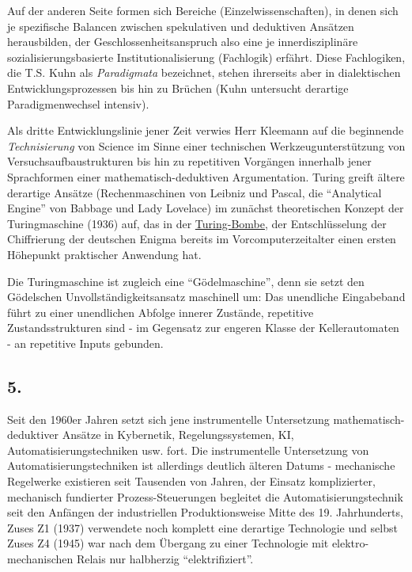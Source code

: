 \documentclass[11pt,a4paper]{article}
\begin{document}
Auf der anderen Seite formen sich Bereiche (Einzelwissenschaften), in
denen sich je spezifische Balancen zwischen spekulativen und deduktiven
Ansätzen herausbilden, der Geschlossenheitsanspruch also eine je
innerdisziplinäre sozialisierungsbasierte Institutionalisierung
(Fachlogik) erfährt. Diese Fachlogiken, die T.S. Kuhn als
\emph{Paradigmata} bezeichnet, stehen ihrerseits aber in dialektischen
Entwicklungsprozessen bis hin zu Brüchen (Kuhn untersucht derartige
Paradigmenwechsel intensiv).

Als dritte Entwicklungslinie jener Zeit verwies Herr Kleemann auf die
beginnende \emph{Technisierung} von Science im Sinne einer technischen
Werkzeugunterstützung von Versuchsaufbaustrukturen bis hin zu
repetitiven Vorgängen innerhalb jener Sprachformen einer
mathematisch-deduktiven Argumentation. Turing greift ältere derartige
Ansätze (Rechenmaschinen von Leibniz und Pascal, die ``Analytical
Engine'' von Babbage und Lady Lovelace) im zunächst theoretischen
Konzept der Turingmaschine (1936) auf, das in der
\href{https://de.wikipedia.org/wiki/Turing-Bombe}{Turing-Bombe}, der
Entschlüsselung der Chiffrierung der deutschen Enigma bereits im
Vorcomputerzeitalter einen ersten Höhepunkt praktischer Anwendung hat.

Die Turingmaschine ist zugleich eine ``Gödelmaschine'', denn sie setzt
den Gödelschen Unvollständigkeitsansatz maschinell um: Das unendliche
Eingabeband führt zu einer unendlichen Abfolge innerer Zustände,
repetitive Zustandsstrukturen sind - im Gegensatz zur engeren Klasse der
Kellerautomaten - an repetitive Inputs gebunden.

\hypertarget{section-4}{%
\subsection{5.}\label{section-4}}

Seit den 1960er Jahren setzt sich jene instrumentelle Untersetzung
mathematisch-deduktiver Ansätze in Kybernetik, Regelungssystemen, KI,
Automatisierungstechniken usw. fort. Die instrumentelle Untersetzung von
Automatisierungstechniken ist allerdings deutlich älteren Datums -
mechanische Regelwerke existieren seit Tausenden von Jahren, der Einsatz
komplizierter, mechanisch fundierter Prozess-Steuerungen begleitet die
Automatisierungstechnik seit den Anfängen der industriellen
Produktionsweise Mitte des 19. Jahrhunderts, Zuses Z1 (1937) verwendete
noch komplett eine derartige Technologie und selbst Zuses Z4 (1945) war
nach dem Übergang zu einer Technologie mit elektro-mechanischen Relais
nur halbherzig ``elektrifiziert''.
\end{document}
